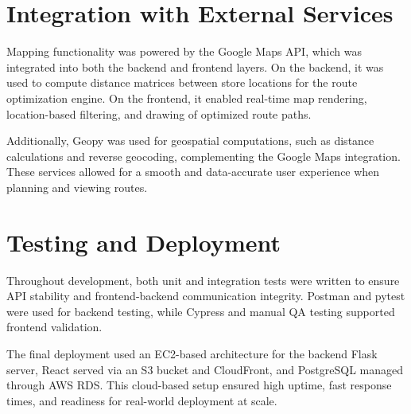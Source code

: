 \section{Integration with External Services}
Mapping functionality was powered by the Google Maps API, which was integrated into both the backend and frontend layers. On the backend, it was used to compute distance matrices between store locations for the route optimization engine. On the frontend, it enabled real-time map rendering, location-based filtering, and drawing of optimized route paths.

Additionally, Geopy was used for geospatial computations, such as distance calculations and reverse geocoding, complementing the Google Maps integration. These services allowed for a smooth and data-accurate user experience when planning and viewing routes.

\section{Testing and Deployment}
Throughout development, both unit and integration tests were written to ensure API stability and frontend-backend communication integrity. Postman and pytest were used for backend testing, while Cypress and manual QA testing supported frontend validation.

The final deployment used an EC2-based architecture for the backend Flask server, React served via an S3 bucket and CloudFront, and PostgreSQL managed through AWS RDS. This cloud-based setup ensured high uptime, fast response times, and readiness for real-world deployment at scale.